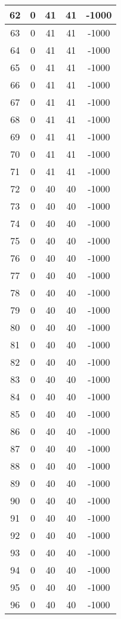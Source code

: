 \documentclass[letterpaper, 12pt]{article}
\begin{document}
\begin{longtable}{|c|c|c|c|c|}
\hline
62 & 0 & 41 & 41 & -1000 \\
\hline
63 & 0 & 41 & 41 & -1000 \\
\hline
64 & 0 & 41 & 41 & -1000 \\
\hline
65 & 0 & 41 & 41 & -1000 \\
\hline
66 & 0 & 41 & 41 & -1000 \\
\hline
67 & 0 & 41 & 41 & -1000 \\
\hline
68 & 0 & 41 & 41 & -1000 \\
\hline
69 & 0 & 41 & 41 & -1000 \\
\hline
70 & 0 & 41 & 41 & -1000 \\
\hline
71 & 0 & 41 & 41 & -1000 \\
\hline
72 & 0 & 40 & 40 & -1000 \\
\hline
73 & 0 & 40 & 40 & -1000 \\
\hline
74 & 0 & 40 & 40 & -1000 \\
\hline
75 & 0 & 40 & 40 & -1000 \\
\hline
76 & 0 & 40 & 40 & -1000 \\
\hline
77 & 0 & 40 & 40 & -1000 \\
\hline
78 & 0 & 40 & 40 & -1000 \\
\hline
79 & 0 & 40 & 40 & -1000 \\
\hline
80 & 0 & 40 & 40 & -1000 \\
\hline
81 & 0 & 40 & 40 & -1000 \\
\hline
82 & 0 & 40 & 40 & -1000 \\
\hline
83 & 0 & 40 & 40 & -1000 \\
\hline
84 & 0 & 40 & 40 & -1000 \\
\hline
85 & 0 & 40 & 40 & -1000 \\
\hline
86 & 0 & 40 & 40 & -1000 \\
\hline
87 & 0 & 40 & 40 & -1000 \\
\hline
88 & 0 & 40 & 40 & -1000 \\
\hline
89 & 0 & 40 & 40 & -1000 \\
\hline
90 & 0 & 40 & 40 & -1000 \\
\hline
91 & 0 & 40 & 40 & -1000 \\
\hline
92 & 0 & 40 & 40 & -1000 \\
\hline
93 & 0 & 40 & 40 & -1000 \\
\hline
94 & 0 & 40 & 40 & -1000 \\
\hline
95 & 0 & 40 & 40 & -1000 \\
\hline
96 & 0 & 40 & 40 & -1000 \\

\end{longtable}
\end{document}

